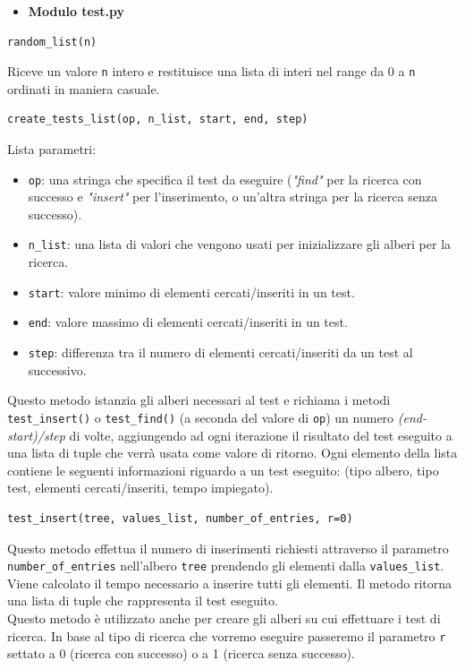 \documentclass{article}
\begin{document}
\begin{itemize}
    \item \textbf{Modulo test.py}
\end{itemize}
\begin{verbatim}random_list(n)\end{verbatim}
Riceve un valore \verb|n| intero e restituisce una lista di interi nel range da 0 a \verb|n| ordinati in maniera casuale.
\begin{verbatim}create_tests_list(op, n_list, start, end, step)\end{verbatim}
Lista parametri:
\begin{itemize}
    \item \verb|op|: una stringa che specifica il test da eseguire (\emph{"find"} per la ricerca con successo e \emph{"insert"} per l'inserimento, o un'altra stringa per la ricerca senza successo).
    \item \verb|n_list|: una lista di valori che vengono usati per inizializzare gli alberi per la ricerca.
    \item \verb|start|: valore minimo di elementi cercati/inseriti in un test.
    \item \verb|end|: valore massimo di elementi cercati/inseriti in un test.
    \item \verb|step|: differenza tra il numero di elementi cercati/inseriti da un test al successivo.
\end{itemize}
Questo metodo istanzia gli alberi necessari al test e richiama i metodi \verb|test_insert()| o \verb|test_find()| (a seconda del valore di \verb|op|) un numero \emph{(end-start)/step} di volte, aggiungendo ad ogni iterazione il risultato del test eseguito a una lista di tuple che verrà usata come valore di ritorno. Ogni elemento della lista contiene le seguenti informazioni riguardo a un test eseguito: (tipo albero, tipo test, elementi cercati/inseriti, tempo impiegato).
\begin{verbatim}test_insert(tree, values_list, number_of_entries, r=0)\end{verbatim}
Questo metodo effettua il numero di inserimenti richiesti attraverso il parametro \verb|number_of_entries| nell'albero \verb|tree| prendendo gli elementi dalla \verb|values_list|. Viene calcolato il tempo necessario a inserire tutti gli elementi. Il metodo ritorna una lista di tuple che rappresenta il test eseguito.\\
Questo metodo è utilizzato anche per creare gli alberi su cui effettuare i test di ricerca. In base al tipo di ricerca che vorremo eseguire passeremo il parametro \verb|r| settato a 0 (ricerca con successo) o a 1 (ricerca senza successo). 
\end{document}
